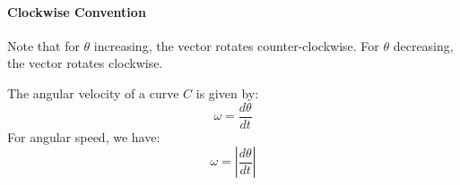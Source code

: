\documentclass[11pt]{article}
\begin{document}
\paragraph{Clockwise Convention} Note that for $\theta$ increasing, the vector rotates counter-clockwise. For $\theta$ decreasing, the vector rotates clockwise.
\begin{definition}
    The angular velocity of a curve $C$ is given by:
    \begin{equation}
        \omega = \frac{d\theta}{dt}
    \end{equation}
    For angular speed, we have:
    \begin{equation}
        \omega = \left|\frac{d\theta}{dt}\right|
    \end{equation}
\end{definition}
\end{document}
